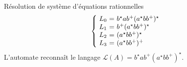 \begin{frame}{Résolution de système d'équations rationnelles}
{    $$
    \left\{
    \begin{array}{@{~}r@{~=~}l}
      L_0 & b^\star a b^+ (a^\star bb^+)^\star\\
      L_1 & b^+ (a^\star bb^+)^\star \\
      L_2 & (a^\star bb^+)^\star \\
      L_3 & (a^\star bb^+)^+\\
    \end{array}
    \right.
    $$
    \alert{L'automate reconnaît le langage $\mathcal{L}(A) = b^\star a b^+ (a^\star bb^+)^\star$.}
  }
  
\end{frame}

\endgroup
